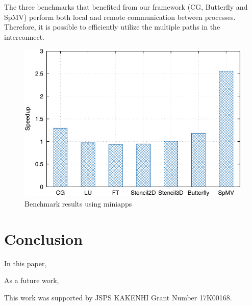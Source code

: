 \documentclass[graybox]{svmult}
\begin{document}
The three benchmarks that benefited from our framework (CG, Butterfly and
SpMV) perform both local and remote communication between processes.
Therefore, it is possible to efficiently utilize the multiple paths in the
interconnect.

\begin{figure}
    \centering
    \includegraphics{benchmark_result}
    \caption{Benchmark results using miniapps}%
    \label{kt:fig:benchmark}
\end{figure}

\section{Conclusion}\label{kt:sec:v}

In this paper,

As a future work,

\begin{acknowledgement}
This work was supported by JSPS KAKENHI Grant Number 17K00168.
\end{acknowledgement}



\end{document}
